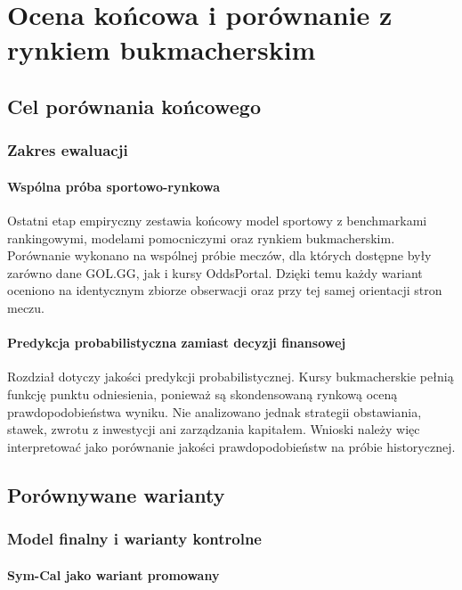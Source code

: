 \chapter{Ocena końcowa i porównanie z rynkiem bukmacherskim}

\section{Cel porównania końcowego}

\subsection{Zakres ewaluacji}

\subsubsection{Wspólna próba sportowo-rynkowa}

Ostatni etap empiryczny zestawia końcowy model sportowy z benchmarkami rankingowymi, modelami pomocniczymi oraz rynkiem bukmacherskim. Porównanie wykonano na wspólnej próbie meczów, dla których dostępne były zarówno dane GOL.GG, jak i kursy OddsPortal. Dzięki temu każdy wariant oceniono na identycznym zbiorze obserwacji oraz przy tej samej orientacji stron meczu.

\subsubsection{Predykcja probabilistyczna zamiast decyzji finansowej}

Rozdział dotyczy jakości predykcji probabilistycznej. Kursy bukmacherskie pełnią funkcję punktu odniesienia, ponieważ są skondensowaną rynkową oceną prawdopodobieństwa wyniku. Nie analizowano jednak strategii obstawiania, stawek, zwrotu z inwestycji ani zarządzania kapitałem. Wnioski należy więc interpretować jako porównanie jakości prawdopodobieństw na próbie historycznej.

\section{Porównywane warianty}

\subsection{Model finalny i warianty kontrolne}

\subsubsection{Sym-Cal jako wariant promowany}

